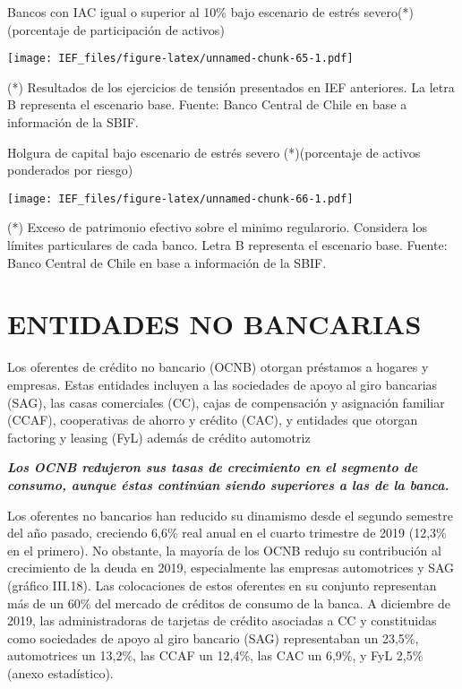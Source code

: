 \documentclass[
]{book}
\begin{document}
Bancos con IAC igual o superior al 10\% bajo escenario de estrés severo(*)(porcentaje de participación de activos)

\texttt{[image: IEF\_files/figure-latex/unnamed-chunk-65-1.pdf]}

(*) Resultados de los ejercicios de tensión presentados en IEF anteriores. La letra B representa el escenario base.
Fuente: Banco Central de Chile en base a información de la SBIF.

Holgura de capital bajo escenario de estrés severo (*)(porcentaje de activos ponderados por riesgo)

\texttt{[image: IEF\_files/figure-latex/unnamed-chunk-66-1.pdf]}

(*) Exceso de patrimonio efectivo sobre el minimo regularorio. Considera los límites particulares de cada banco. Letra B representa el escenario base.
Fuente: Banco Central de Chile en base a información de la SBIF.

\hypertarget{ENB}{%
\section*{ENTIDADES NO BANCARIAS}\label{ENB}}

Los oferentes de crédito no bancario (OCNB) otorgan préstamos a hogares y
empresas. Estas entidades incluyen a las sociedades de apoyo al giro bancarias
(SAG), las casas comerciales (CC), cajas de compensación y asignación familiar
(CCAF), cooperativas de ahorro y crédito (CAC), y entidades que otorgan
factoring y leasing (FyL) además de crédito automotriz

\textbf{\emph{Los OCNB redujeron sus tasas de crecimiento en el segmento de consumo, aunque éstas continúan siendo superiores a las de la banca.}}

Los oferentes no bancarios han reducido su dinamismo desde el segundo
semestre del año pasado, creciendo 6,6\% real anual en el cuarto trimestre de
2019 (12,3\% en el primero). No obstante, la mayoría de los OCNB redujo su
contribución al crecimiento de la deuda en 2019, especialmente las empresas
automotrices y SAG (gráfico III.18). Las colocaciones de estos oferentes en su
conjunto representan más de un 60\% del mercado de créditos de consumo
de la banca. A diciembre de 2019, las administradoras de tarjetas de crédito
asociadas a CC y constituidas como sociedades de apoyo al giro bancario (SAG)
representaban un 23,5\%, automotrices un 13,2\%, las CCAF un 12,4\%, las
CAC un 6,9\%, y FyL 2,5\% (anexo estadístico).
\end{document}
